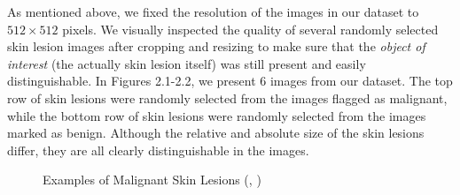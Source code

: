 \documentclass [MAS] {uclathes}
\begin{document}
As mentioned above, we fixed the resolution of the images in our dataset to $512 \times 512$ pixels. We visually inspected the quality of several randomly selected skin lesion images after cropping and resizing to make sure that the \textit{object of interest} (the actually skin lesion itself) was still present and easily distinguishable. In Figures 2.1-2.2, we present 6 images from our dataset. The top row of skin lesions were randomly selected from the images flagged as malignant, while the bottom row of skin lesions were randomly selected from the images marked as benign. Although the relative and absolute size of the skin lesions differ, they are all clearly distinguishable in the images. 

\begin{figure}[hbt!]
\hspace*{\fill}
\centering
{}\hspace{0.5em}
\hspace{0.5em}
\hspace*{\fill}
\label{fig:mel_examples}
\vspace{-1cm}
\caption{Examples of Malignant Skin Lesions (\cite{ISIC}, \cite{ISIC2})}
\end{figure}
\end{document}
